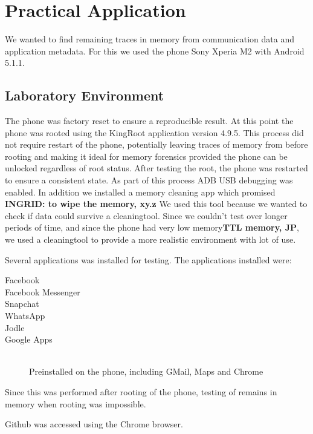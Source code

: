 \section{Practical Application}
We wanted to find remaining traces in memory from communication data and application metadata. For this we used the phone Sony Xperia M2 with Android 5.1.1.

\subsection{Laboratory Environment}
The phone was factory reset to ensure a reproducible result. At this point the phone was rooted %
using the KingRoot application version 4.9.5. This process did not require restart of the phone, potentially leaving traces of memory from before rooting and making it ideal for memory forensics provided the phone can be unlocked regardless of root status. After testing the root, the phone was restarted to ensure a consistent state. As part of this process ADB USB debugging was enabled. In addition we installed a memory cleaning app which promised \textbf{INGRID: to wipe the memory, xy.z}
We used this tool because we wanted to check if data could survive a cleaningtool. Since we couldn't test over longer periods of time, and since the phone had very low memory\textbf{TTL memory, JP}, we used a cleaningtool to provide a more realistic environment with lot of use. 

Several applications was installed for testing. The applications installed were:
\begin{description}
\item[Facebook]
\item[Facebook Messenger]
\item[Snapchat]
\item[WhatsApp]
\item[Jodle]
\item[Google Apps] \hfill\\Preinstalled on the phone, including GMail, Maps and Chrome
\end{description}
Since this was performed after rooting of the phone, testing of remains in memory when rooting was impossible.

Github was accessed using the Chrome browser.
